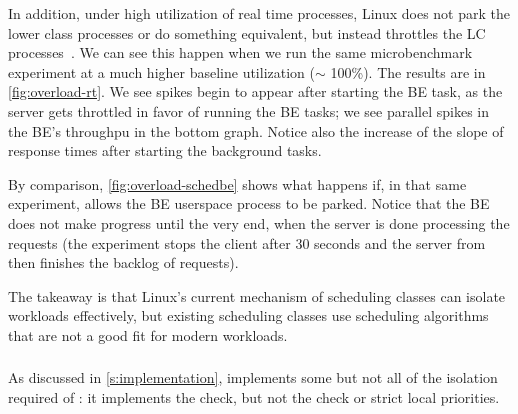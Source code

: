 In addition, under high utilization of real time processes, Linux does not park
the lower class processes or do something equivalent, but instead throttles the
\fifoclass{} LC processes~\cite{lkml-deadline-srv}. We can see this happen when
we run the same microbenchmark experiment at a much higher baseline utilization
($\sim$ 100\%). The results are in \autoref{fig:overload-rt}. We see spikes
begin to appear after starting the BE task, as the \fifoclass{} server gets
throttled in favor of running the BE tasks; we see parallel spikes in the BE's
throughpu in the bottom graph. Notice also the increase of the slope of response
times after starting the background tasks.

By comparison, \autoref{fig:overload-schedbe} shows what happens if, in that
same experiment, \schedbe{} allows the BE userspace process to be parked. Notice
that the BE does not make progress until the very end, when the server is done
processing the requests (the experiment stops the client after 30 seconds and
the server from then finishes the backlog of requests).

The takeaway is that Linux's current mechanism of scheduling classes can isolate
workloads effectively, but existing scheduling classes use scheduling
algorithms that are not a good fit for modern workloads.

\subsubsection{\schedidle}\label{ss:schedidle}

As discussed in \autoref{s:implementation}, \schedidle{} implements some but not
all of the isolation required of \beclass{}: it implements the \entry{} check,
but not the \exit{} check or strict local priorities.

